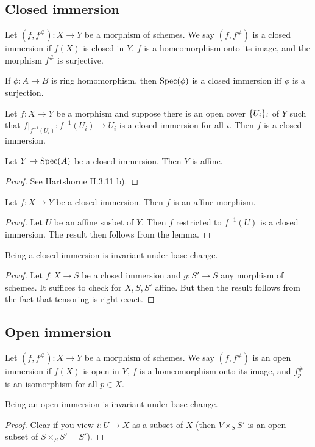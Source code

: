 \documentclass{memoir}
\begin{document}
\subsection{Closed immersion}
\begin{definition}
    Let $(f,f^\#):X\to Y$ be a morphism of schemes.
    We say $(f,f^\#)$ is a closed immersion if $f(X)$ is closed in $Y$, $f$ is a homeomorphism onto its image, and the morphism $f^\#$ is surjective.
\end{definition}
\begin{remark}
    If $\phi:A\to B$ is ring homomorphism, then $\operatorname{Spec}(\phi)$ is a closed immersion iff $\phi$ is a surjection.
\end{remark}
\begin{proposition}
    Let $f:X\to Y$ be a morphism and suppose there is an open cover $\lbrace U_i\rbrace_i$ of $Y$ such that $f|_{f^{-1}(U_i)}:f^{-1}(U_i)\to U_i$ is a closed immersion for all $i$.
    Then $f$ is a closed immersion.
\end{proposition}
\begin{lemma}
    Let $Y\to \operatorname{Spec}(A)$ be a closed immersion. 
    Then $Y$ is affine.
\end{lemma}
\begin{proof}
    See Hartshorne II.3.11 b).
\end{proof}
\begin{corollary}
    Let $f:X\to Y$ be a closed immersion. 
    Then $f$ is an affine morphism.
\end{corollary}
\begin{proof}
    Let $U$ be an affine susbet of $Y$.
    Then $f$ restricted to $f^{-1}(U)$ is a closed immersion.
    The result then follows from the lemma.
\end{proof}
\begin{proposition}
    Being a closed immersion is invariant under base change.
\end{proposition}
\begin{proof}
    Let $f:X\to S$ be a closed immersion and $g:S'\to S$ any morphism of schemes.
    It suffices to check for $X,S,S'$ affine.
    But then the result follows from the fact that tensoring is right exact.
\end{proof}
\subsection{Open immersion}
\begin{definition}
    Let $(f,f^\#):X\to Y$ be a morphism of schemes.
    We say $(f,f^\#)$ is an open immersion if $f(X)$ is open in $Y$, $f$ is a homeomorphism onto its image, and $f_p^\#$ is an isomorphism for all $p\in X$.
\end{definition}
\begin{proposition}
    Being an open immersion is invariant under base change.
\end{proposition}
\begin{proof}
    Clear if you view $i:U\to X$ as a subset of $X$ (then $V\times_SS'$ is an open subset of $S\times_SS' = S'$).
\end{proof}
\end{document}

